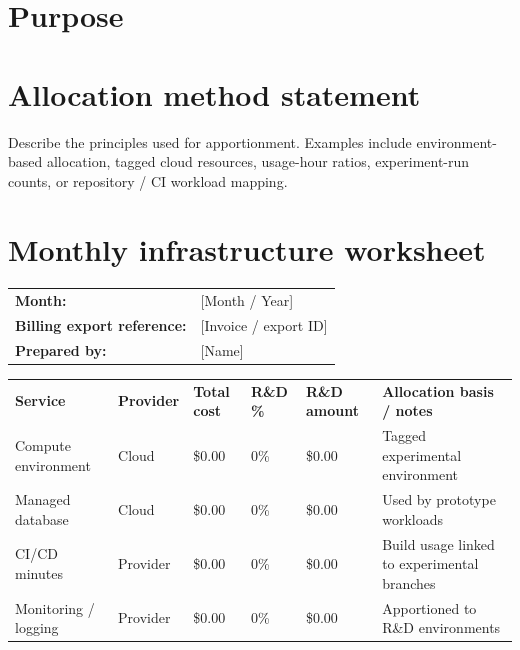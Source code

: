 \documentclass[11pt]{article}
\begin{document}
\RDTitlePage
\tableofcontents
\clearpage

\section{Purpose}


\section{Allocation method statement}
Describe the principles used for apportionment. Examples include environment-based allocation, tagged cloud resources, usage-hour ratios, experiment-run counts, or repository / CI workload mapping.

\section{Monthly infrastructure worksheet}
\begin{tabularx}{\textwidth}{@{}L{4.6cm}Y@{}}
\textbf{Month:} & {[Month / Year]} \\
\textbf{Billing export reference:} & {[Invoice / export ID]} \\
\textbf{Prepared by:} & {[Name]} \\
\end{tabularx}

\begin{xltabular}{\textwidth}{L{3.2cm}L{1.8cm}L{1.8cm}L{1.8cm}L{1.9cm}Y}
\textbf{Service} & \textbf{Provider} & \textbf{Total cost} & \textbf{R\&D \%} & \textbf{R\&D amount} & \textbf{Allocation basis / notes} \\
{Compute environment} & {Cloud} & {\$0.00} & {0\%} & {\$0.00} & {Tagged experimental environment} \\
{Managed database} & {Cloud} & {\$0.00} & {0\%} & {\$0.00} & {Used by prototype workloads} \\
{CI/CD minutes} & {Provider} & {\$0.00} & {0\%} & {\$0.00} & {Build usage linked to experimental branches} \\
{Monitoring / logging} & {Provider} & {\$0.00} & {0\%} & {\$0.00} & {Apportioned to R\&D environments} \\
\end{xltabular}
\end{document}

